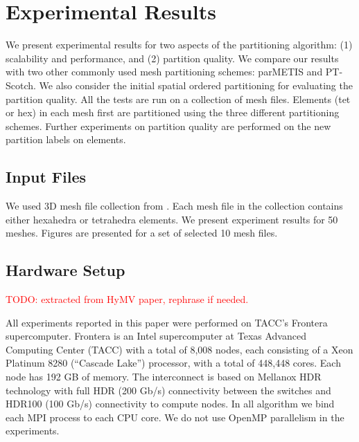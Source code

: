 \documentclass[conference]{IEEEtran}
\begin{document}

\section{Experimental Results}
We present experimental results for two aspects of the partitioning algorithm: (1) scalability and performance, and (2) partition quality. We compare our results with two other commonly used mesh partitioning schemes: parMETIS and PT-Scotch. We also consider the initial spatial ordered partitioning for evaluating the partition quality. All the tests are run on a collection of mesh files. Elements (tet or hex) in each mesh first are partitioned using the three different partitioning schemes. Further experiments on partition quality are performed on the new partition labels on elements.


\subsection{Input Files}
We used 3D mesh file collection from \cite{meshes}. Each mesh file in the collection contains either hexahedra or tetrahedra elements. We present experiment results for 50 meshes. Figures are presented for a set of selected 10 mesh files.


\subsection{Hardware Setup}
\textcolor{red}{\textcolor{red}{TODO}: extracted from HyMV paper, rephrase if needed.}

All experiments reported in this paper were performed on TACC's Frontera \cite{Frontera} supercomputer. Frontera is an Intel supercomputer at Texas Advanced Computing Center (TACC) with a total of 8,008 nodes, each consisting of a Xeon Platinum 8280 (“Cascade Lake”) processor, with a total of 448,448 cores. Each node has 192 GB of memory. The interconnect is based on Mellanox HDR technology with full HDR (200 Gb/s) connectivity between the switches and HDR100 (100 Gb/s) connectivity to compute nodes. In all algorithm we bind each MPI process to each CPU core. We do not use OpenMP parallelism in the experiments.
\end{document}

